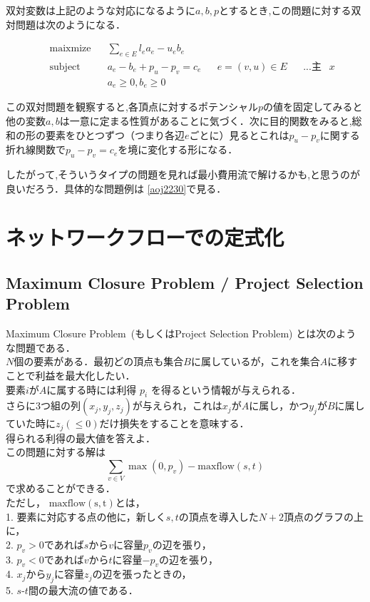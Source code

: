 \documentclass[13pt]{jarticle}
\theoremstyle{nonitalic} %
\begin{document}
双対変数は上記のような対応になるように$a,b,p$とするとき,この問題に対する双対問題は次のようになる．

\begin{align}
&&&&&\textrm{maixmize}   && \sum_{e\in E} l_e a_e - u_e b_e  \\
&&&&&\textrm{subject to} && a_e - b_e + p_u - p_v = c_e && e = (v,u) \in E  && \textrm{...主変数$x$}& \\
&&&&& && a_e \geq 0, b_e \geq 0 &&&&&&&&
\end{align}

この双対問題を観察すると,各頂点に対するポテンシャル$p$の値を固定してみると他の変数$a,b$は一意に定まる性質があることに気づく．次に目的関数をみると,総和の形の要素をひとつずつ（つまり各辺$e$ごとに）見るとこれは$p_u-p_v$に関する折れ線関数で$p_u-p_v=c_e$を境に変化する形になる．

したがって,そういうタイプの問題を見れば最小費用流で解けるかも,と思うのが良いだろう．具体的な問題例は \ref{aoj2230}で見る．

\section{ネットワークフローでの定式化}
\subsection{Maximum Closure Problem / Project Selection Problem}
Maximum Closure Problem~(もしくはProject Selection Problem) とは次のような問題である．\\

$N$個の要素がある．最初どの頂点も集合$B$に属しているが，これを集合$A$に移すことで利益を最大化したい． \\
要素$i$が$A$に属する時には利得 $p_i$ を得るという情報が与えられる． \\
さらに3つ組の列$(x_j, y_j, z_j)$が与えられ，これは$x_j$が$A$に属し，かつ$y_j$が$B$に属していた時に$z_j(\leq 0)$だけ損失をすることを意味する． \\
得られる利得の最大値を答えよ． \\


この問題に対する解は
\[ \sum_{v \in V } \max(0,p_v) - \mathrm{maxflow}(s,t) \]
で求めることができる．\\
ただし， $\mathrm{maxflow(s,t)}$とは，\\
1. 要素に対応する点の他に，新しく$s,t$の頂点を導入した$N+2$頂点のグラフの上に，\\
2. $p_v>0$であれば$s$から$v$に容量$p_v$の辺を張り，\\
3. $p_v<0$であれば$v$から$t$に容量$-p_v$の辺を張り，\\
4. $x_j$から$y_j$に容量$z_j$の辺を張ったときの，\\
5. $s$-$t$間の最大流の値である．
\end{document}
